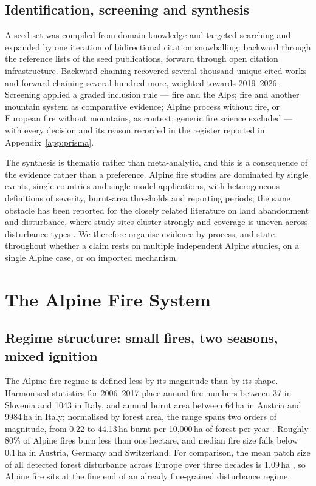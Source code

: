 \documentclass[11pt,a4paper]{article}
\begin{document}
\subsection{Identification, screening and synthesis}

A seed set was compiled from domain knowledge and targeted searching and expanded by one iteration of bidirectional citation snowballing: backward through the reference lists of the seed publications, forward through open citation infrastructure. Backward chaining recovered several thousand unique cited works and forward chaining several hundred more, weighted towards 2019--2026. Screening applied a graded inclusion rule --- fire and the Alps; fire and another mountain system as comparative evidence; Alpine process without fire, or European fire without mountains, as context; generic fire science excluded --- with every decision and its reason recorded in the register reported in Appendix~\ref{app:prisma}.

The synthesis is thematic rather than meta-analytic, and this is a consequence of the evidence rather than a preference. Alpine fire studies are dominated by single events, single countries and single model applications, with heterogeneous definitions of severity, burnt-area thresholds and reporting periods; the same obstacle has been reported for the closely related literature on land abandonment and disturbance, where study sites cluster strongly and coverage is uneven across disturbance types \citep{mantero_influence_2020}. We therefore organise evidence by process, and state throughout whether a claim rests on multiple independent Alpine studies, on a single Alpine case, or on imported mechanism.

\tableofcontents
\newpage


\section{The Alpine Fire System}
\label{sec:system}

\subsection{Regime structure: small fires, two seasons, mixed ignition}

The Alpine fire regime is defined less by its magnitude than by its shape. Harmonised statistics for 2006--2017 place annual fire numbers between 37 in Slovenia and 1043 in Italy, and annual burnt area between 64\,ha in Austria and 9984\,ha in Italy; normalised by forest area, the range spans two orders of magnitude, from 0.22 to 44.13\,ha burnt per 10{,}000\,ha of forest per year \citep{muller_forest_2020}. Roughly 80\% of Alpine fires burn less than one hectare, and median fire size falls below 0.1\,ha in Austria, Germany and Switzerland. For comparison, the mean patch size of all detected forest disturbance across Europe over three decades is 1.09\,ha \citep{senf_mapping_2021}, so Alpine fire sits at the fine end of an already fine-grained disturbance regime.
\end{document}
